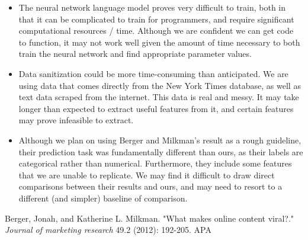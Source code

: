 \documentclass[10pt]{article}
\begin{document}
\begin{itemize}
\item The neural network language model proves very difficult to train, both in that it can be complicated to train for programmers, and require significant computational resources / time. Although we are confident we can get code to function, it may not work well given the amount of time necessary to both train the neural network and find appropriate parameter values.
\item Data sanitization could be more time-consuming than anticipated. We are using data that comes directly from the New York Times database, as well as text data scraped from the internet. This data is real and messy. It may take longer than expected to extract useful features from it, and certain features may prove infeasible to extract.
\item Although we plan on using Berger and Milkman's result as a rough guideline, their prediction task was fundamentally different than ours, as their labels are categorical rather than numerical. Furthermore, they include some features that we are unable to replicate. We may find it difficult to draw direct comparisons between their results and ours, and may need to resort to a different (and simpler) baseline of comparison.
\end{itemize}

 \begin{thebibliography}{1}
 
  Berger, Jonah, and Katherine L. Milkman. "What makes online content viral?." {\em Journal of marketing research} 49.2 (2012): 192-205.
APA	
 
 \end{thebibliography} 


	
\end{document}

